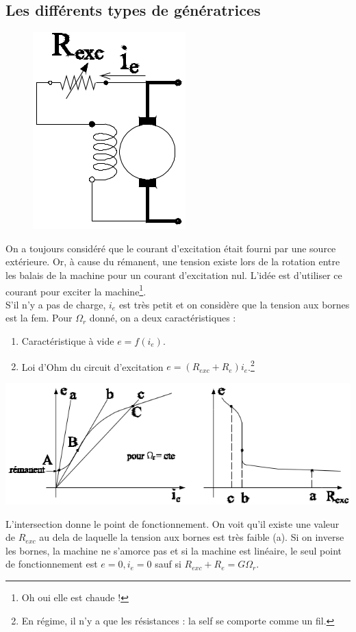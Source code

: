 	\subsection{Les différents types de génératrices}
	\begin{figure}
	\vspace{-5mm}
	\includegraphics[scale=0.34]{ch4/image16.png}
	\end{figure}
	On a toujours considéré que le courant d'excitation était fourni par une source 
	extérieure. Or, à cause du rémanent, une tension existe lors de la rotation entre 
	les balais de la machine pour un courant d'excitation nul. L'idée est d'utiliser 
	ce courant pour exciter la machine\footnote{Oh oui elle est chaude !}.\\
	S'il n'y a pas de charge, $i_e$ est très petit et on considère que la tension aux 
	bornes est la fem. Pour $\Omega_r$ donné, on a deux caractéristiques :
	\begin{enumerate}
	\item Caractéristique à vide $e = f(i_e)$.
	\item Loi d'Ohm du circuit d’excitation $e=(R_{exc}+R_e)i_e$.\footnote{En régime, 
	il n'y a que les résistances : la self se comporte comme un fil.}
	\end{enumerate}
	\begin{center}
	\includegraphics[scale=0.37]{ch4/image17.png}
	\end{center}
	L'intersection donne le point de fonctionnement. On voit qu'il existe une valeur 
	de $R_{exc}$ au dela de laquelle la tension aux bornes est très faible (a). Si 
	on inverse les bornes, la machine ne s'amorce pas et si la machine est linéaire, 
	le seul point de fonctionnement est $e=0,i_e=0$ sauf si $R_{exc}+R_e=G\Omega_r$.\\
	
